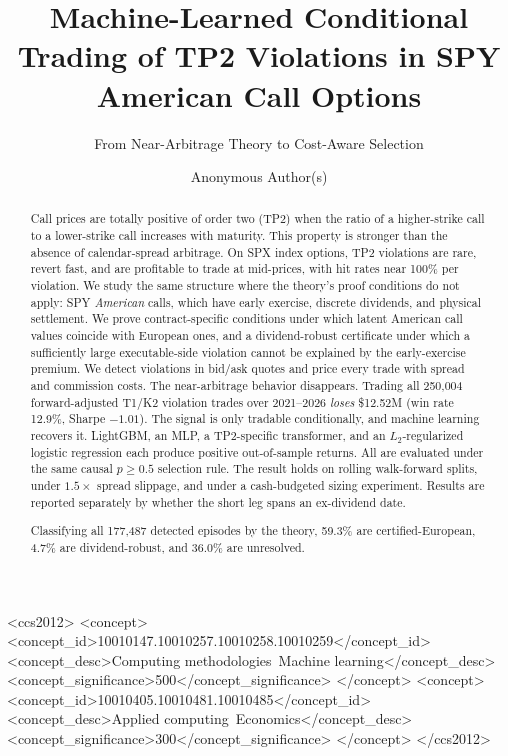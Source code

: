 \documentclass[sigconf,review,anonymous]{acmart}
\begin{document}
\title{Machine-Learned Conditional Trading of TP2 Violations in SPY American Call Options}
\subtitle{From Near-Arbitrage Theory to Cost-Aware Selection}

\author{Anonymous Author(s)}

\renewcommand{\shortauthors}{Anonymous et al.}

\begin{abstract}
Call prices are totally positive of order two (TP2) when the ratio of a higher-strike call to a lower-strike call increases with maturity. This property is stronger than the absence of calendar-spread arbitrage. On SPX index options, TP2 violations are rare, revert fast, and are profitable to trade at mid-prices, with hit rates near 100\% per violation. We study the same structure where the theory's proof conditions do not apply: SPY \emph{American} calls, which have early exercise, discrete dividends, and physical settlement. We prove contract-specific conditions under which latent American call values coincide with European ones, and a dividend-robust certificate under which a sufficiently large executable-side violation cannot be explained by the early-exercise premium. We detect violations in bid/ask quotes and price every trade with spread and commission costs. The near-arbitrage behavior disappears. Trading all 250{,}004 forward-adjusted T1/K2 violation trades over 2021--2026 \emph{loses} \$12.52M (win rate 12.9\%, Sharpe $-1.01$). The signal is only tradable conditionally, and machine learning recovers it. LightGBM, an MLP, a TP2-specific transformer, and an $L_2$-regularized logistic regression each produce positive out-of-sample returns. All are evaluated under the same causal $p\ge0.5$ selection rule. The result holds on rolling walk-forward splits, under $1.5\times$ spread slippage, and under a cash-budgeted sizing experiment. Results are reported separately by whether the short leg spans an ex-dividend date.

Classifying all 177{,}487 detected episodes by the theory, 59.3\% are certified-European, 4.7\% are dividend-robust, and 36.0\% are unresolved.
\end{abstract}

\begin{CCSXML}
<ccs2012>
 <concept>
  <concept_id>10010147.10010257.10010258.10010259</concept_id>
  <concept_desc>Computing methodologies~Machine learning</concept_desc>
  <concept_significance>500</concept_significance>
 </concept>
 <concept>
  <concept_id>10010405.10010481.10010485</concept_id>
  <concept_desc>Applied computing~Economics</concept_desc>
  <concept_significance>300</concept_significance>
 </concept>
</ccs2012>
\end{CCSXML}
\end{document}
